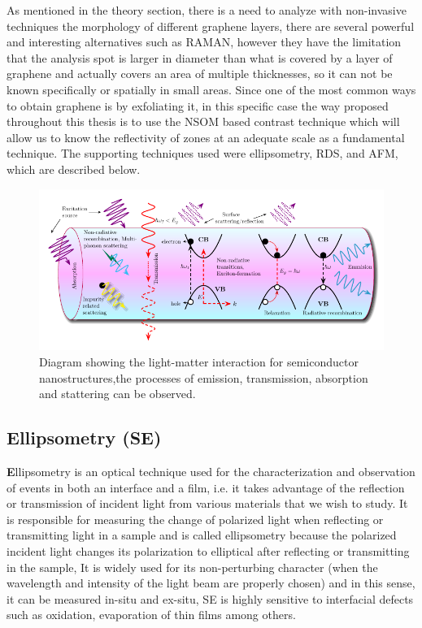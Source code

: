 As mentioned in the theory section, there is a need to analyze with non-invasive techniques the morphology of different graphene layers, there are several powerful and interesting alternatives such as RAMAN, however they have the limitation that the analysis spot is larger in diameter than what is covered by a layer of graphene and actually covers an area of multiple thicknesses, so it can not be known specifically or spatially in small areas. Since one of the most common ways to obtain graphene is by exfoliating it, in this specific case the way proposed throughout this thesis is to use the NSOM based contrast technique which will allow us to know the reflectivity of zones at an adequate scale as a fundamental technique. The supporting techniques used were ellipsometry, RDS, and AFM, which are described below.    


\begin{figure}[H]
	\centering
	\includegraphics[width=0.8\linewidth]{FIGURES/Characterization_techniques/spectroscopies}
	\caption{Diagram showing the light-matter interaction for semiconductor nanostructures,the processes of emission, transmission, absorption and stattering can be observed.\cite{cardona2005fundamentals,yi2012semiconductor,sivadasan2017optical  } }
	\label{fig:schematic-light-matter}
\end{figure}


\subsection{Ellipsometry (SE)}
\vspace{-1cm}
\lettrine[lines=3, lraise=0.1, nindent=0mm, slope=0mm]{\textbf{E}}{}llipsometry is an optical technique used for the characterization and observation of events in both an interface and a film, i.e. it takes advantage of the reflection or transmission of incident light from various materials that we wish to study. It is responsible for measuring the change of polarized light when reflecting or transmitting light in a sample and is called ellipsometry because the polarized incident light changes its polarization to elliptical after reflecting or transmitting in the sample,  It is widely used for its non-perturbing character \cite{azzam1978ellipsometry} (when the wavelength and intensity of the light beam are properly chosen) and in this sense, it can be measured in-situ and ex-situ, SE is highly sensitive to interfacial defects such as oxidation, evaporation of thin films among others\cite{fujiwara2007spectroscopic}.



